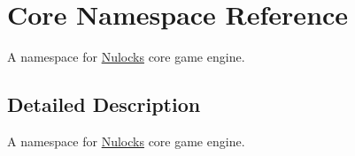 \hypertarget{namespace_core}{\section{Core Namespace Reference}
\label{namespace_core}
}


A namespace for \hyperlink{namespace_nulocks}{Nulocks} core game engine.  




\subsection{Detailed Description}
A namespace for \hyperlink{namespace_nulocks}{Nulocks} core game engine. 